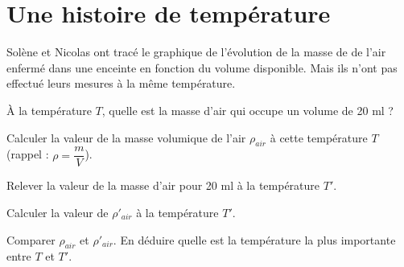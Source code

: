 \section{Une histoire de température}

Solène et Nicolas ont tracé le graphique de l'évolution de la masse de de l'air enfermé dans une enceinte en fonction du volume disponible. Mais ils n'ont pas effectué leurs mesures à la même température.

\begin{questions}
	\question \`A la température $T$, quelle est la masse d'air qui occupe un volume de 20 ml ?
	\fillwithdottedlines{2cm}
	
	\question Calculer la valeur de la masse volumique de l'air $\rho_{air} $ à cette température $T$ (rappel : $\rho = \dfrac{m}{V}$).
	\fillwithdottedlines{3cm}
	
	\question Relever la valeur de la masse d'air pour 20 ml  à la température $T'$.
	
	\fillwithdottedlines{2cm}
	
	\question Calculer la valeur de $\rho '_{air} $ à la température $T'$.
	
	\fillwithdottedlines{3cm}
	
	\question Comparer $\rho_{air}$ et $\rho'_{air}$. En déduire quelle est la température la plus importante entre $T$ et $T'$.
	
	\fillwithdottedlines{4cm}
	
	
\end{questions}

